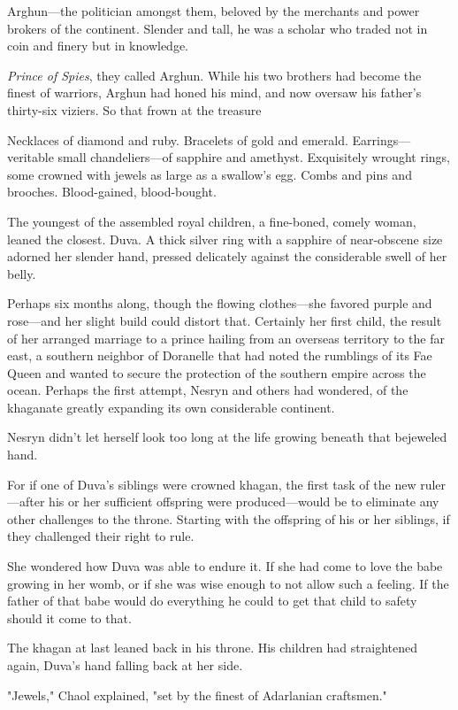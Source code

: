 Arghun---the politician amongst them, beloved by the merchants and power brokers of the continent. Slender and tall, he was a scholar who traded not in coin and finery but in knowledge.

\emph{Prince of Spies}, they called Arghun. While his two brothers had become the finest of warriors, Arghun had honed his mind, and now oversaw his father's thirty-six viziers. So that frown at the treasure

Necklaces of diamond and ruby. Bracelets of gold and emerald. Earrings--- veritable small chandeliers---of sapphire and amethyst. Exquisitely wrought rings, some crowned with jewels as large as a swallow's egg. Combs and pins and brooches. Blood-gained, blood-bought.

The youngest of the assembled royal children, a fine-boned, comely woman, leaned the closest. Duva. A thick silver ring with a sapphire of near-obscene size adorned her slender hand, pressed delicately against the considerable swell of her belly.

Perhaps six months along, though the flowing clothes---she favored purple and rose---and her slight build could distort that. Certainly her first child, the result of her arranged marriage to a prince hailing from an overseas territory to the far east, a southern neighbor of Doranelle that had noted the rumblings of its Fae Queen and wanted to secure the protection of the southern empire across the ocean. Perhaps the first attempt, Nesryn and others had wondered, of the khaganate greatly expanding its own considerable continent.

Nesryn didn't let herself look too long at the life growing beneath that bejeweled hand.

For if one of Duva's siblings were crowned khagan, the first task of the new ruler---after his or her sufficient offspring were produced---would be to eliminate any other challenges to the throne. Starting with the offspring of his or her siblings, if they challenged their right to rule.

She wondered how Duva was able to endure it. If she had come to love the babe growing in her womb, or if she was wise enough to not allow such a feeling. If the father of that babe would do everything he could to get that child to safety should it come to that.

The khagan at last leaned back in his throne. His children had straightened again, Duva's hand falling back at her side.

"Jewels," Chaol explained, "set by the finest of Adarlanian craftsmen."

